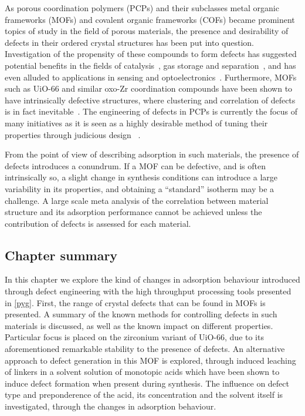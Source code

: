 As porous coordination polymers (PCPs) and their subclasses
metal organic frameworks (MOFs) and covalent organic frameworks (COFs)
became prominent topics of study in the field of porous materials,
the presence and desirability of defects in their ordered crystal
structures has been put into question. Investigation of the 
propensity of these compounds to form defects has suggested 
potential benefits in the fields of 
catalysis~\cite{shollDefectsMetalOrganic2015}, gas storage
and separation~\cite{%
    choiRoleStructuralDefects2018,%
    ghoshWaterAdsorptionUiO662014,%
    liSelectiveGasAdsorption2009%
}, and has even alluded to applications in
sensing and optoelectronics~\cite{cliffeMetalOrganicNanosheets2017}.
Furthermore, MOFs
such as UiO-66 and similar oxo-Zr coordination compounds have been 
shown to have intrinsically defective structures, where clustering 
and correlation of defects is in fact 
inevitable~\cite{cliffeCorrelatedDefectNanoregions2014}.
The engineering of defects in PCPs is currently the focus of many
initiatives as it is seen as a highly desirable method of tuning 
their properties through judicious design
~\cite{
    shollDefectsMetalOrganic2015,%
    bennettInterplayDefectsDisorder2016,%
    liangLinkingDefectsHierarchical2018%
}.

From the point of view of describing adsorption in 
such materials, the presence of defects introduces a conundrum.
If a MOF can be defective, and is often intrinsically so,
a slight change in synthesis conditions can introduce a 
large variability in its properties, and obtaining a 
``standard'' isotherm may be a challenge. A large scale
meta analysis of the correlation between material structure
and its adsorption performance cannot be achieved unless
the contribution of defects is assessed for each material.

\subsection*{Chapter summary}

In this chapter we explore the kind of changes in 
adsorption behaviour introduced through defect engineering with 
the high throughput processing tools presented in \autoref{pyg}.
First, the range of crystal defects that can be found in MOFs 
is presented. A summary of the known methods for controlling defects in
such materials is discussed, as well as the known impact on 
different properties.
Particular focus is placed on the zirconium variant of UiO-66,
due to its aforementioned remarkable stability to the presence of defects.
An alternative approach to defect generation in this MOF is explored,
through induced leaching of linkers in a solvent solution of monotopic
acids which have been shown to induce defect formation when present
during synthesis. The influence on defect type and preponderence 
of the acid, its concentration and 
the solvent itself is investigated, through the changes in 
adsorption behaviour.

